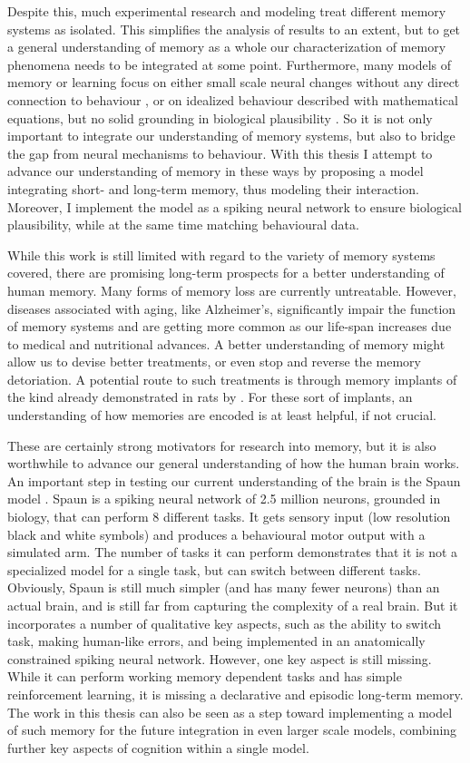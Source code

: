 Despite this, much experimental research and modeling treat different memory systems as isolated.
This simplifies the analysis of results to an extent, but to get a general understanding of memory as a whole our characterization of memory phenomena needs to be integrated at some point.
Furthermore, many models of memory or learning focus on either small scale neural changes without any direct connection to behaviour \parencite[e.g.,][]{Levy2005}, or on idealized behaviour
described with mathematical equations, but no solid grounding in biological plausibility \parencite[e.g.,][]{Milford2004}.
So it is not only important to integrate our understanding of memory systems, but also to bridge the gap from neural mechanisms to behaviour.
With this thesis I attempt to advance our understanding of memory in these ways by proposing a model integrating short- and long-term memory, thus modeling their interaction.
Moreover, I implement the model as a spiking neural network to ensure biological plausibility, while at the same time matching behavioural data.

While this work is still limited with regard to the variety of memory systems covered, there are promising long-term prospects for a better understanding of human memory.
Many forms of memory loss are currently untreatable.
However, diseases associated with aging, like Alzheimer's, significantly impair the function of memory systems and are getting more common as our life-span increases due to medical and nutritional advances.
A better understanding of memory might allow us to devise better treatments, or even stop and reverse the memory detoriation.
A potential route to such treatments is through memory implants of the kind already demonstrated in rats by \textcite{Berger2011}.
For these sort of implants, an understanding of how memories are encoded is at least helpful, if not crucial.

These are certainly strong motivators for research into memory, but it is also worthwhile to advance our general understanding of how the human brain works.
An important step in testing our current understanding of the brain is the Spaun model \parencite{Eliasmith2012}.
Spaun is a spiking neural network of 2.5 million neurons, grounded in biology, that can perform 8 different tasks.
It gets sensory input (low resolution black and white symbols) and produces a behavioural motor output with a simulated arm.
The number of tasks it can perform demonstrates that it is not a specialized model for a single task, but can switch between different tasks.
Obviously, Spaun is still much simpler (and has many fewer neurons) than an actual brain, and is still far from capturing the complexity of a real brain.
But it incorporates a number of qualitative key aspects, such as the ability to switch task, making human-like errors, and being implemented in an anatomically constrained spiking neural network.
However, one key aspect is still missing.
While it can perform working memory dependent tasks and has simple reinforcement learning, it is missing a declarative and episodic long-term memory.
The work in this thesis can also be seen as a step toward implementing a model of such memory for the future integration in even larger scale models, combining further key aspects of cognition within a single model.


